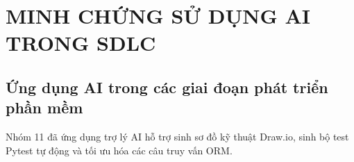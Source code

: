 \chapter{MINH CHỨNG SỬ DỤNG AI TRONG SDLC}
\label{ch:13}

\section{Ứng dụng AI trong các giai đoạn phát triển phần mềm}
Nhóm 11 đã ứng dụng trợ lý AI hỗ trợ sinh sơ đồ kỹ thuật Draw.io, sinh bộ test Pytest tự động và tối ưu hóa các câu truy vấn ORM.

